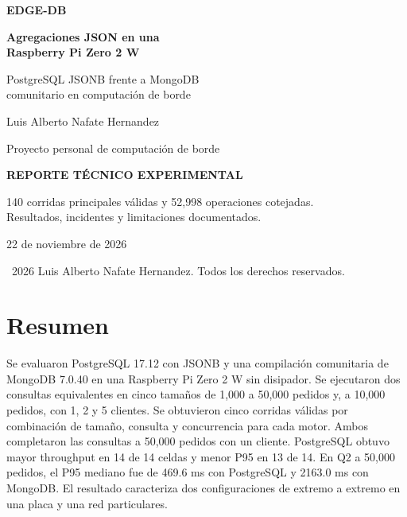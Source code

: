 \documentclass[10pt,a4paper]{article}
\begin{document}
\begin{titlepage}
\thispagestyle{empty}
\centering
\setlength{\parskip}{0pt}
\color{black}
\vspace*{4mm}
{\Large\textbf{EDGE-DB}\par}
\vspace{30mm}
{\fontsize{25}{30}\selectfont\bfseries\color{azul} Agregaciones JSON en una\\Raspberry Pi Zero 2 W\par}
\vspace{7mm}
{\Large PostgreSQL JSONB frente a MongoDB\\comunitario en computación de borde\par}
\vspace{13mm}
{\large Luis Alberto Nafate Hernandez\par}
\vspace{4mm}
Proyecto personal de computación de borde\par
\vfill
{\large\textbf{REPORTE TÉCNICO EXPERIMENTAL}\par}
\vspace{4mm}
{\small 140 corridas principales válidas y 52,998 operaciones cotejadas.\\Resultados, incidentes y limitaciones documentados.\par}
\vspace{7mm}
22 de noviembre de 2026\par
\vspace{2mm}
{\small \textcopyright\ 2026 Luis Alberto Nafate Hernandez. Todos los derechos reservados.\par}
\vspace*{3mm}
\end{titlepage}
\setcounter{page}{2}

\section*{Resumen}
Se evaluaron PostgreSQL 17.12 con JSONB y una compilación comunitaria de MongoDB 7.0.40 en una Raspberry Pi Zero 2 W sin disipador. Se ejecutaron dos consultas equivalentes en cinco tamaños de 1,000 a 50,000 pedidos y, a 10,000 pedidos, con 1, 2 y 5 clientes. Se obtuvieron cinco corridas válidas por combinación de tamaño, consulta y concurrencia para cada motor. Ambos completaron las consultas a 50,000 pedidos con un cliente. PostgreSQL obtuvo mayor throughput en 14 de 14 celdas y menor P95 en 13 de 14. En Q2 a 50,000 pedidos, el P95 mediano fue de 469.6 ms con PostgreSQL y 2163.0 ms con MongoDB. El resultado caracteriza dos configuraciones de extremo a extremo en una placa y una red particulares.
\end{document}
